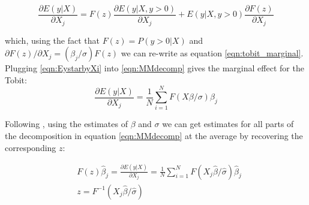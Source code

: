 \documentclass[11pt, oneside]{article}
\begin{document}
\begin{appendices}
		\begin{equation}
		\frac{\partial E(y|X)}{\partial X_j} = F(z)\frac{\partial E(y|X,y>0)}{\partial X_j} +  E(y|X, y>0)\frac{\partial F(z)}{\partial X_j} 
		\label{eqn:MMdecomp}
		\end{equation}
		
		which, using the fact that $F(z) = P(y>0|X)$ and $\partial{F(z)}/\partial{X_j} = (\beta_j/\sigma)F(z)$  we can re-write as equation \ref{eqn:tobit_marginal}.
		Plugging \ref{eqn:EystarbyXi} into \ref{eqn:MMdecomp} gives the marginal effect for the Tobit:
		\begin{equation}
		\frac{\partial E(y|X)}{\partial X_j} = \frac{1}{N} \sum_{i=1}^N F(X\beta/ \sigma) \beta_j 
		\label{eqn:marginalTobit}
		\end{equation}
		
		
		\noindent Following \cite{Mcdonald1980}, using the estimates of $\beta$ and $\sigma$ we can get estimates for all parts of the decomposition in equation \ref{eqn:MMdecomp} at the average by recovering the corresponding $z$:
		
		\begin{align*}
		\label{eqn:decomposition}
		& F(z)\hat{\beta}_j = \frac{\partial E(y|X)}{\partial X_j} = \frac{1}{N} \sum_{i=1}^N F(X_j \hat{\beta}/ \hat{\sigma})\hat \beta_j \\
		& z = F^{-1}(X_j \hat{\beta}/ \hat{\sigma}) \\
		\end{align*}
		\begin{comment}
		& E(y|X,y>0)  = X\beta + \sigma\frac{f(z)}{F(z)}  \\
		& \frac{\partial E(y|X,y>0) }{\partial X_i} = \beta_i + \left(\frac{\sigma}{F(z)}\frac{\partial f(z)}{\partial Xi} - \frac{\sigma f(z)}{F(z)^2}\frac{\partial F(z)}{\partial Xi} \right) \\
		& = \beta_i\left(1- \frac{f(z)^2}{F(z)^2} - \frac{zf(z)}{F(z)}\right)
		& \\
		&  \left(1- \frac{f(z)^2}{F(z)^2} - \frac{zf(z)}{F(z)}\right) = 
		\end{align*}
		\end{comment}
		
		
		
		
	\end{appendices}
	
	
\end{document}
